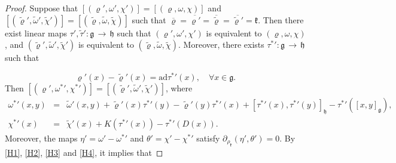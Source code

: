\documentclass[12pt]{amsart}
\newcommand {\emptycomment}[1]{}
\newcommand{\lon }{\,\rightarrow\,}
\newcommand{\g}{\mathfrak g}
\newcommand{\h}{\mathfrak h}
\newcommand{\frkk}{\mathfrak k}
\newcommand{\ad}{\mathrm{ad}}
\begin{document}
\begin{proof}
Suppose that $[(\varrho', \omega', \chi')]=[(\varrho, \omega, \chi)]$ and $
[(\tilde{\varrho}', \tilde{\omega}', \tilde{\chi}')]=[(\tilde{\varrho}, \tilde{\omega}, \tilde{\chi})]$ such that $\overline{\varrho}=\overline{\varrho'}=\overline{\tilde{\varrho}}=\overline{\tilde{\varrho}'}=\frkk$. Then there exist linear maps $\tau', \tilde{\tau}':\g\lon\h$ such that $(\varrho', \omega', \chi')$ is equivalent to $(\varrho, \omega, \chi)$, and $(\tilde{\varrho}', \tilde{\omega}', \tilde{\chi}')$ is equivalent to $(\tilde{\varrho}, \tilde{\omega}, \tilde{\chi})$.
Moreover, there exists $\tau^{*}{'}:\g\lon\h$ such that
\emptycomment{
\begin{eqnarray*}
\left\{\begin{array}{rcl}
\varrho(x)u-\varrho'(x)u&=&[\tau'(x), u]_\h,\\
\omega(x, y)-\omega'(x, y)&=&\varrho'(x)\tau'(y)-\varrho'(y)\tau'(x)+[\tau'(x), \tau'(y)]_\h-\tau'([x, y]_\g),\\
\chi(x)-\chi'(x)&=&K(\tau'(x))-\tau'(D(x)),
\end{array}\right.
\end{eqnarray*}
\begin{eqnarray*}
\left\{\begin{array}{rcl}
\tilde{\varrho}(x)u-\tilde{\varrho}'(x)u&=&[\tilde{\tau}'(x), u]_\h,\\
\tilde{\omega}(x, y)-\tilde{\omega}'(x, y)&=&\tilde{\varrho}'(x)\tilde{\tau}'(y)-\tilde{\varrho}'(y)\tilde{\tau}'(x)+[\tilde{\tau}'(x), \tilde{\tau}'(y)]_\h-\tilde{\tau}'([x, y]_\g),\\
\tilde{\chi}(x)-\tilde{\chi}'(x)&=&K(\tilde{\tau}'(x))-\tilde{\tau}'(D(x)),
\end{array}\right.
\end{eqnarray*}
for all $x, y\in\g, u\in\h$, and}
$$\varrho'(x)-\tilde{\varrho}'(x)=\ad\tau^{*}{'}(x), \quad\forall x\in\g.$$ Then $[(\varrho', \omega^{*}{'}, \chi^{*}{'})]=[(\tilde{\varrho}', \tilde{\omega}', \tilde{\chi}')]$, where
\begin{eqnarray}
\label{H3}\omega^{*}{'}(x, y)&=&\tilde{\omega}'(x, y)+\tilde{\varrho}'(x)\tau^{*}{'}(y)-\tilde{\varrho}'(y)\tau^{*}{'}(x)+[\tau^{*}{'}(x), \tau^{*}{'}(y)]_\h-\tau^{*}{'}([x, y]_\g),\\
\label{H4}\chi^{*}{'}(x)&=&\tilde{\chi}'(x)+K(\tau^{*}{'}(x))-\tau^{*}{'}(D(x)).
\end{eqnarray}
Moreover, the maps $\eta'=\omega'-\omega^{*}{'}$ and $\theta'=\chi'-\chi^{*}{'}$ satisfy $\partial_{\rho_\frkk}(\eta', \theta')=0$. By \eqref{H1}, \eqref{H2}, \eqref{H3} and \eqref{H4}, it implies that

\end{proof}
\end{document}
